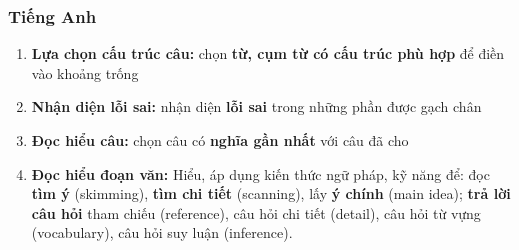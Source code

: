 \subsubsection{Tiếng Anh}
\begin{enumerate}
    \item \textbf{Lựa chọn cấu trúc câu:} chọn \textbf{từ, cụm từ có cấu trúc phù hợp} để điền vào khoảng trống
    \item \textbf{Nhận diện lỗi sai:} nhận diện \textbf{lỗi sai} trong những phần được gạch chân
    \item \textbf{Đọc hiểu câu:} chọn câu có \textbf{nghĩa gần nhất} với câu đã cho
    \item \textbf{Đọc hiểu đoạn văn:} Hiểu, áp dụng kiến thức ngữ pháp, kỹ năng để: đọc \textbf{tìm ý} (skimming), \textbf{tìm chi tiết} (scanning), lấy \textbf{ý chính} (main idea); \textbf{trả lời câu hỏi} tham chiếu (reference), câu hỏi chi tiết (detail), câu hỏi từ vựng (vocabulary), câu hỏi suy luận (inference).
\end{enumerate}
